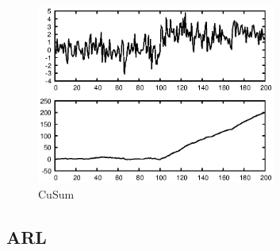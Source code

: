 \documentclass[doctoral,utf8,lot,loar,lof,shortloft,index]{jydiss}
\begin{document}


\begin{figure}[!htb]
	\centering
	\includegraphics[width=0.7\textwidth]{images/example_output_cusum.eps}
	\caption{CuSum}\label{fig:cusum_output_example}
\end{figure}

\subsection{ARL}
\end{document}

